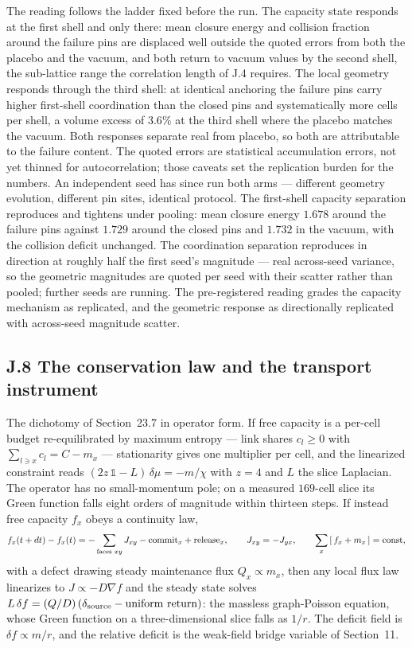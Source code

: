 \documentclass[11pt]{article}
\begin{document}
The reading follows the ladder fixed before the run. The capacity state responds at the first shell and only there: mean closure energy and collision fraction around the failure pins are displaced well outside the quoted errors from both the placebo and the vacuum, and both return to vacuum values by the second shell, the sub-lattice range the correlation length of J.4 requires. The local geometry responds through the third shell: at identical anchoring the failure pins carry higher first-shell coordination than the closed pins and systematically more cells per shell, a volume excess of $3.6\%$ at the third shell where the placebo matches the vacuum. Both responses separate real from placebo, so both are attributable to the failure content. The quoted errors are statistical accumulation errors, not yet thinned for autocorrelation; those caveats set the replication burden for the numbers. An independent seed has since run both arms --- different geometry evolution, different pin sites, identical protocol. The first-shell capacity separation reproduces and tightens under pooling: mean closure energy $1.678$ around the failure pins against $1.729$ around the closed pins and $1.732$ in the vacuum, with the collision deficit unchanged. The coordination separation reproduces in direction at roughly half the first seed's magnitude --- real across-seed variance, so the geometric magnitudes are quoted per seed with their scatter rather than pooled; further seeds are running. The pre-registered reading grades the capacity mechanism as replicated, and the geometric response as directionally replicated with across-seed magnitude scatter.

\subsection*{J.8 The conservation law and the transport instrument}

The dichotomy of Section~23.7 in operator form. If free capacity is a per-cell budget re-equilibrated by maximum entropy --- link shares $c_l\ge0$ with $\sum_{l\ni x}c_l=C-m_x$ --- stationarity gives one multiplier per cell, and the linearized constraint reads $(2z\,\mathbb{1}-L)\,\delta\mu=-m/\chi$ with $z=4$ and $L$ the slice Laplacian. The operator has no small-momentum pole; on a measured $169$-cell slice its Green function falls eight orders of magnitude within thirteen steps. If instead free capacity $f_x$ obeys a continuity law,
\[
f_x(t+dt)-f_x(t)=-\sum_{\text{faces }xy}J_{xy}-{\rm commit}_x+{\rm release}_x,
\qquad J_{xy}=-J_{yx},
\qquad \sum_x\,[\,f_x+m_x\,]={\rm const},
\]
with a defect drawing steady maintenance flux $Q_x\propto m_x$, then any local flux law linearizes to $J\propto-D\nabla f$ and the steady state solves $L\,\delta f=(Q/D)\,(\delta_{\rm source}-{\rm uniform\ return})$: the massless graph-Poisson equation, whose Green function on a three-dimensional slice falls as $1/r$. The deficit field is $\delta f\propto m/r$, and the relative deficit is the weak-field bridge variable of Section~11.
\end{document}
